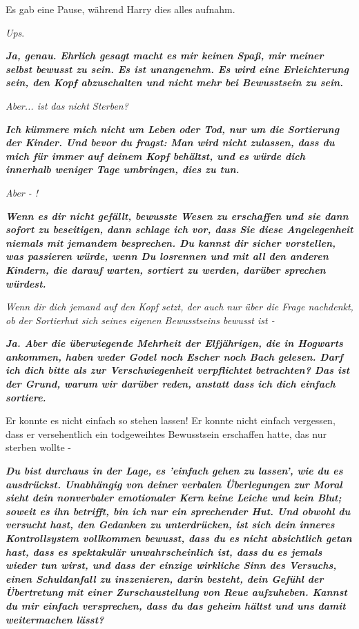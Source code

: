 Es gab eine Pause, während Harry dies alles aufnahm.

\emph{Ups}.

\textbf{\emph{ \glqq Ja, genau. Ehrlich gesagt macht es mir keinen Spaß, mir
meiner selbst bewusst zu sein. Es ist unangenehm. Es wird eine Erleichterung
sein, den Kopf abzuschalten und nicht mehr bei Bewusstsein zu sein.\grqq{} }}

\emph{ Aber... ist das nicht Sterben?}

\textbf{\emph{ \glqq Ich kümmere mich nicht um Leben oder Tod, nur um die
Sortierung der Kinder. Und bevor du fragst: Man wird nicht zulassen, dass du
mich für immer auf deinem Kopf behältst, und es würde dich innerhalb weniger
Tage umbringen, dies zu tun.\grqq{} }}

\emph{Aber - !}

\textbf{\emph{ \glqq Wenn es dir nicht gefällt, bewusste Wesen zu erschaffen und
sie dann sofort zu beseitigen, dann schlage ich vor, dass Sie diese
Angelegenheit niemals mit jemandem besprechen. Du kannst dir sicher vorstellen,
was passieren würde, wenn Du losrennen und mit all den anderen Kindern, die
darauf warten, sortiert zu werden, darüber sprechen würdest.\grqq{} }}

\emph{ Wenn dir dich jemand auf den Kopf setzt, der auch nur über die Frage
nachdenkt, ob der Sortierhut sich seines eigenen Bewusstseins bewusst ist -}

\textbf{\emph{ \glqq Ja. Aber die überwiegende Mehrheit der Elfjährigen, die in
Hogwarts ankommen, haben weder Godel noch Escher noch Bach gelesen. Darf ich
dich bitte als zur Verschwiegenheit verpflichtet betrachten? Das ist der Grund,
warum wir darüber reden, anstatt dass ich dich einfach sortiere.\grqq{} }}

Er konnte es nicht einfach so stehen lassen! Er konnte nicht einfach vergessen,
dass er versehentlich ein todgeweihtes Bewusstsein erschaffen hatte, das nur
sterben wollte -

\textbf{\emph{ \glqq Du bist durchaus in der Lage, es 'einfach gehen zu lassen',
wie du es ausdrückst. Unabhängig von deiner verbalen Überlegungen zur Moral
sieht dein nonverbaler emotionaler Kern keine Leiche und kein Blut; soweit es
ihn betrifft, bin ich nur ein sprechender Hut. Und obwohl du versucht hast, den
Gedanken zu unterdrücken, ist sich dein inneres Kontrollsystem vollkommen
bewusst, dass du es nicht absichtlich getan hast, dass es spektakulär
unwahrscheinlich ist, dass du es jemals wieder tun wirst, und dass der einzige
wirkliche Sinn des Versuchs, einen Schuldanfall zu inszenieren, darin besteht,
dein Gefühl der Übertretung mit einer Zurschaustellung von Reue aufzuheben.
Kannst du mir einfach versprechen, dass du das geheim hältst und uns damit
weitermachen lässt?\grqq{} }}

